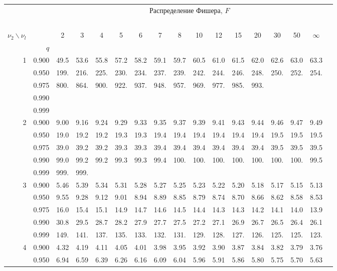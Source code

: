 \documentclass[pdftex,11pt,openany]{book}\usepackage[]{graphicx}\usepackage[]{color}
\begin{document}
{\begin{center}
\begin{tabular}{rrr@{\,}r@{\,}r@{\,}r@{\,}r@{\,}r@{\,}r@{\,}r
                   @{\,}r@{\,}r@{\,}r@{\,}r@{\,}r@{\,}r@{\,}r}
&&\multicolumn{14}{c}{Распределение Фишера, $F$}\\
\ \\
$\nu_2\backslash\nu_l$ & & 
\multicolumn{1}{c}{2} &\multicolumn{1}{c}{3} &
\multicolumn{1}{c}{4} &\multicolumn{1}{c}{5} &
\multicolumn{1}{c}{6} &\multicolumn{1}{c}{7} &
\multicolumn{1}{c}{8} &\multicolumn{1}{c}{10}&
\multicolumn{1}{c}{12}&\multicolumn{1}{c}{15}&
\multicolumn{1}{c}{20}&\multicolumn{1}{c}{30}&
\multicolumn{1}{c}{50}&\multicolumn{1}{c}{$\infty$}\\
& $q$ \\
1&0.900&49.5&53.6&55.8&57.2&58.2&59.1&59.7&60.5&61.0&61.5&62.0&62.6&63.0&63.3\\
 &0.950&199.&216.&225.&230.&234.&237.&239.&242.&244.&246.&248.&250.&252.&254.\\
 &0.975&800.&864.&900.&922.&937.&948.&957.&969.&977.&985.&993.\\
 &0.990\\
 &0.999\\
2&0.900&9.00&9.16&9.24&9.29&9.33&9.35&9.37&9.39&9.41&9.43&9.44&9.46&9.47&9.49\\ 
 &0.950&19.0&19.2&19.2&19.3&19.3&19.4&19.4&19.4&19.4&19.4&19.4&19.5&19.5&19.5\\
 &0.975&39.0&39.2&39.2&39.3&39.3&39.4&39.4&39.4&39.4&39.4&39.4&39.5&39.5&39.5\\
 &0.990&99.0&99.2&99.2&99.3&99.3&99.4&100.&100.&100.&100.&100.&100.&100.&99.5\\
 &0.999&999.&999.\\
3&0.900&5.46&5.39&5.34&5.31&5.28&5.27&5.25&5.23&5.22&5.20&5.18&5.17&5.15&5.13\\
 &0.950&9.55&9.28&9.12&9.01&8.94&8.89&8.85&8.79&8.74&8.70&8.66&8.62&8.58&8.53\\
 &0.975&16.0&15.4&15.1&14.9&14.7&14.6&14.5&14.4&14.3&14.3&14.2&14.1&14.0&13.9\\
 &0.990&30.8&29.5&28.7&28.2&27.9&27.7&27.5&27.2&27.1&26.9&26.7&26.5&26.4&26.1\\
 &0.999&149.&141.&137.&135.&133.&132.&131.&129.&128.&127.&126.&125.&125.&123.\\
4&0.900&4.32&4.19&4.11&4.05&4.01&3.98&3.95&3.92&3.90&3.87&3.84&3.82&3.79&3.76\\
 &0.950&6.94&6.59&6.39&6.26&6.16&6.09&6.04&5.96&5.91&5.86&5.80&5.75&5.70&5.63\\

\end{tabular}
\end{center}}
\end{document}

